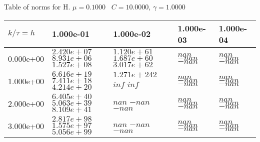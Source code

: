 \begin{center}
Table of norms for H. $\mu = 0.1000$ \, $C = 10.0000$, $\gamma = 1.0000$
  
\begin{tabular}{|p{1in}|p{1in}|p{1in}|p{1in}|p{1in}|} \hline
$k / \tau = h$ &1.000e-01 &1.000e-02 &1.000e-03 &1.000e-04 \\ \hline 
0.000e+00 & $2.420e+07$  $8.931e+06$  $1.527e+08$  & $1.120e+61$  $1.687e+60$  $3.017e+62$  & $nan$  $-nan$  $-nan$  & $nan$  $-nan$  $-nan$  \\ \hline 
1.000e+00 & $6.616e+19$  $7.411e+18$  $4.214e+20$  & $1.271e+242$  $inf$  $inf$  & $nan$  $-nan$  $-nan$  & $nan$  $-nan$  $-nan$  \\ \hline 
2.000e+00 & $6.405e+40$  $5.063e+39$  $8.109e+41$  & $nan$  $-nan$  $-nan$  & $nan$  $-nan$  $-nan$  & $nan$  $-nan$  $-nan$  \\ \hline 
3.000e+00 & $2.817e+98$  $1.575e+97$  $5.056e+99$  & $nan$  $-nan$  $-nan$  & $nan$  $-nan$  $-nan$  & $nan$  $-nan$  $-nan$  \\ \hline 

\end{tabular}\\[20pt]
\end{center}
